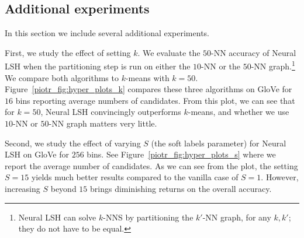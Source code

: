 \documentclass[11pt]{article}
\begin{document}

\subsection{Additional experiments}
In this section we include several additional experiments.

First, we study the effect of setting $k$.
We evaluate the $50$-NN accuracy of Neural LSH when the partitioning step is run on either the $10$-NN or the $50$-NN graph.\footnote{Neural LSH can solve $k$-NNS by partitioning the $k'$-NN graph, for any $k,k'$; they do not have to be equal.} We compare both algorithms to $k$-means with $k = 50$. 
Figure~\ref{piotr_fig:hyper_plots_k} compares these three algorithms on
GloVe for $16$ bins reporting
average numbers of candidates. From this plot,
we can see that for $k = 50$, Neural LSH
convincingly outperforms $k$-means,
and whether we use $10$-NN or $50$-NN graph matters very little.

Second, we study the effect of varying $S$ (the soft labels parameter) for Neural LSH on GloVe for $256$ bins.
See Figure~\ref{piotr_fig:hyper_plots_s} where we report the average number of candidates. As we can see from the plot,
the setting $S = 15$ yields much better results
compared to the vanilla case of $S = 1$. However,
increasing $S$ beyond $15$ brings diminishing returns  on the overall
accuracy.
\end{document}
